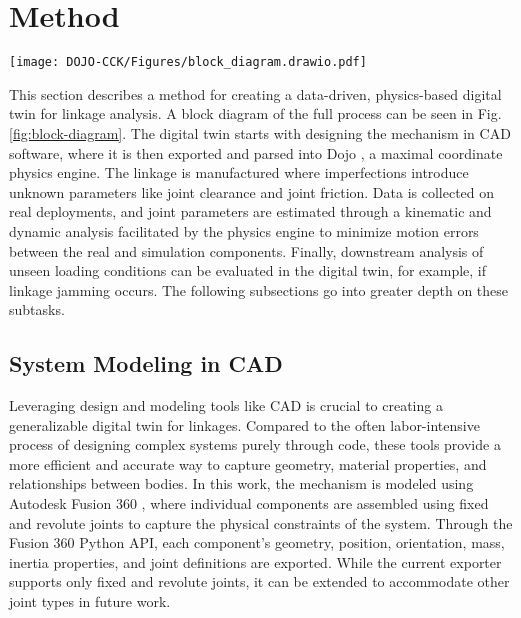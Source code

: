 \section{Method} \label{method}
\begin{figure*}
    \centering
\texttt{[image: DOJO-CCK/Figures/block\_diagram.drawio.pdf]}
    \caption{A block diagram illustrating the data-driven, physics-based digital twin pipeline for linkage analysis. The process begins with a CAD model, exported to the physics engine for rigid body simulation. Simultaneously, real-world data is captured through various sensors (e.g., video, motion capture, and other sensing technologies) and synthesized using methods like optical flow or Kalman filters to estimate joint positions. The synthesized data undergoes kinematic analysis to estimate joint clearance, followed by dynamic analysis to estimate joint friction. These parameters are fed back into the physics engine for downstream analysis, including simulations of unseen loading conditions, jamming detection, and evaluating force/torque requirements.}
    \label{fig:block-diagram}
\end{figure*}

This section describes a method for creating a data-driven, physics-based digital twin for linkage analysis. A block diagram of the full process can be seen in Fig. \ref{fig:block-diagram}. The digital twin starts with designing the mechanism in CAD software, where it is then exported and parsed into Dojo \cite{howell_dojo_2022}, a maximal coordinate physics engine. The linkage is manufactured where imperfections introduce unknown parameters like joint clearance and joint friction. Data is collected on real deployments, and joint parameters are estimated through a kinematic and dynamic analysis facilitated by the physics engine to minimize motion errors between the real and simulation components. Finally, downstream analysis of unseen loading conditions can be evaluated in the digital twin, for example, if linkage jamming occurs. The following subsections go into greater depth on these subtasks.   

\subsection{System Modeling in CAD}

Leveraging design and modeling tools like CAD is crucial to creating a generalizable digital twin for linkages. Compared to the often labor-intensive process of designing complex systems purely through code, these tools provide a more efficient and accurate way to capture geometry, material properties, and relationships between bodies. In this work, the mechanism is modeled using Autodesk Fusion 360 \cite{autodesk_fusion_2014}, where individual components are assembled using fixed and revolute joints to capture the physical constraints of the system. Through the Fusion 360 Python API, each component's geometry, position, orientation, mass, inertia properties, and joint definitions are exported. While the current exporter supports only fixed and revolute joints, it can be extended to accommodate other joint types in future work.

